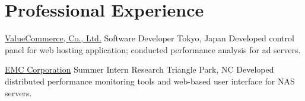 \section{Professional Experience}
		{\href{http://valuecommerce.com}{ValueCommerce, Co., Ltd.}}
		{Software Developer}
		{Tokyo, Japan}{}
		{Developed control panel for web hosting application; conducted
		 performance analysis for ad servers.}

		{\href{http://www.emc.com}{EMC Corporation}}
		{Summer Intern}
		{Research Triangle Park, NC}{}
		{Developed distributed performance monitoring tools and
		 web-based user interface for NAS servers.}




